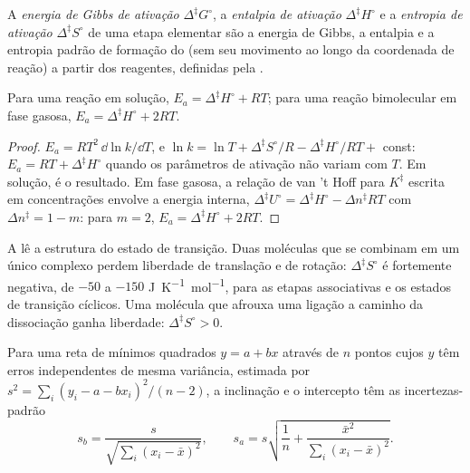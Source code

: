 \begin{definition}\label{def:b3:rate-theories:activation}
A \emph{energia de Gibbs de ativação}
$\Delta^{\ddagger}G^\circ$, a \emph{entalpia de ativação} $\Delta^{\ddagger}H^\circ$ e a
\emph{entropia de ativação} $\Delta^{\ddagger}S^\circ$ de uma etapa
elementar são a energia de Gibbs, a entalpia e a entropia padrão de formação do
 (sem seu movimento ao longo da coordenada de reação) a partir dos
reagentes, definidas pela .
\end{definition}

\begin{proposition}\label{prop:b3:rate-theories:ea-dh}
Para uma reação em solução, $E_a = \Delta^{\ddagger}H^\circ + RT$; para uma reação bimolecular em fase gasosa,
$E_a = \Delta^{\ddagger}H^\circ + 2RT$.
\end{proposition}

\begin{proof}
$E_a = RT^2\,\dd\ln k/\dd T$, e $\ln k = \ln T + \Delta^{\ddagger}S^\circ/R - \Delta^{\ddagger}H^\circ/RT + $ const: $E_a =
RT + \Delta^{\ddagger}H^\circ$ quando os parâmetros de ativação não variam com $T$. Em solução,
é o resultado. Em fase gasosa, a relação de van 't Hoff para $K^{\ddagger}$ escrita
em concentrações envolve a energia interna, $\Delta^{\ddagger}U^\circ = \Delta^{\ddagger}H^\circ - \Delta n^{\ddagger}RT$
com $\Delta n^{\ddagger} = 1 - m$: para $m = 2$, $E_a = \Delta^{\ddagger}H^\circ + 2RT$.
\end{proof}

A  lê a estrutura do estado de transição. Duas moléculas
que se combinam em um único complexo perdem liberdade de translação e de
rotação: $\Delta^{\ddagger}S^\circ$ é fortemente negativa, de $-50$ a $-150$ \unit{J.K^{-1}.mol^{-1}}, para
as etapas associativas e os estados de transição cíclicos. Uma molécula que
afrouxa uma ligação a caminho da dissociação ganha liberdade: $\Delta^{\ddagger}S^\circ > 0$.

\begin{proposition}\label{prop:b3:rate-theories:slope-uncertainty}
Para uma reta de mínimos quadrados $y = a + bx$ através de $n$ pontos cujos $y$ têm
erros independentes de mesma variância, estimada por $s^2 = \sum_i(y_i - a - bx_i)^2/(n - 2)$,
a inclinação e o intercepto têm as incertezas-padrão
\[
  s_b = \frac{s}{\sqrt{\sum_i(x_i - \bar x)^2}}, \qquad
  s_a = s\sqrt{\frac1n + \frac{\bar x^2}{\sum_i(x_i - \bar x)^2}} .
\]
\end{proposition}


